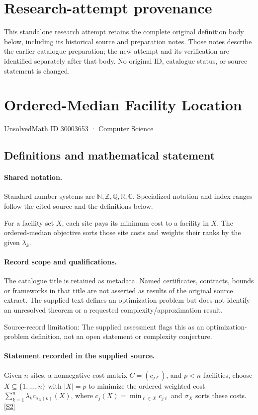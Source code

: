 \documentclass[11pt]{article}
\begin{document}
\section*{Research-attempt provenance}
This standalone research attempt retains the complete original definition body below,
including its historical source and preparation notes. Those notes describe the
earlier catalogue preparation; the new attempt and its verification are identified
separately after that body. No original ID, catalogue status, or source statement is changed.

\section{Ordered-Median Facility Location}\label{30003653}
{\small UnsolvedMath ID 30003653 · Computer Science}
\subsection{Definitions and mathematical statement}

\paragraph{Shared notation.}Standard number systems are $\mathbb N,\mathbb Z,\mathbb Q,\mathbb R,\mathbb C$. Specialized notation and index ranges follow the cited source and the definitions below.


For a facility set $X$, each site pays its minimum cost to a facility in $X$. The ordered-median objective sorts those site costs and weights their ranks by the given $\lambda_k$.
\paragraph{Record scope and qualifications.}
The catalogue title is retained as metadata. Named certificates, contracts, bounds or frameworks in that title are not asserted as results of the original source extract.
The supplied text defines an optimization problem but does not identify an unresolved theorem or a requested complexity/approximation result.

Source-record limitation: The supplied assessment flags this as an optimization-problem definition, not an open statement or complexity conjecture.
\paragraph{Statement recorded in the supplied source.}
Given $n$ sites, a nonnegative cost matrix $C=(c_{j\ell})$, and $p<n$ facilities, choose $X\subseteq\{1,\ldots,n\}$ with $|X|=p$ to minimize the ordered weighted cost $\sum_{k=1}^n\lambda_k c_{\sigma_X(k)}(X)$, where $c_j(X)=\min_{\ell\in X}c_{j\ell}$ and $\sigma_X$ sorts these costs. \href{https://doi.org/10.4171/owr/2017/52}{[S2]}
\end{document}
